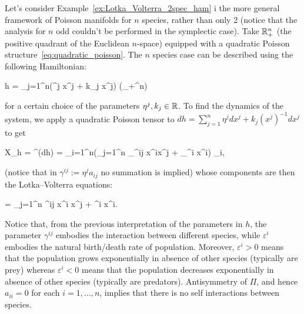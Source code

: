 \documentclass[main.tex]{subfiles}
\begin{document}
\begin{example}
\label{ex:Lotka_Volterra_nspec_pois}
	Let's consider Example~\ref{ex:Lotka_Volterra_2spec_ham} i the more general framework of Poisson manifolds for $n$ species, rather than only 2 (notice that the analysis for $n$ odd couldn't be performed in the symplectic case).
	Take $\mathbb{R}^n_+$ (the positive quadrant of the Euclidean $n$-space) equipped with a quadratic Poisson structure~\eqref{eq:quadratic_poisson}. The $n$ species case can be described using the following Hamiltonian:
	\begin{eqalign}
		h = \sum_{j=1}^n(\eta^j x^j + k_j \log x^j) \in \Cinfty(\R_+^n)
	\end{eqalign}
	for a certain choice of the parameters $\eta^j, k_j \in \mathbb{R}$. To find the dynamics of the system, we apply a quadratic Poisson tensor to $dh = \sum_{j=1}^n \eta^j dx^j + k_j (x^j)^{-1} dx^j$ to get
	\begin{eqalign}
		X_h = \Pi^\sharp(dh) = \sum_{i=1}^n\big(\sum_{j=1}^n _{\gamma^{ij}} x^ix^j + _{\varepsilon^i} x^i\big) \partial_i,
	\end{eqalign}
	(notice that in $\gamma^{ij} := \eta^j a_{ij}$ no summation is implied) whose components are then the Lotka--Volterra equations:
	\begin{eqalign}
		 = \sum_{j=1}^n \gamma^{ij} x^i x^j + \varepsilon^i x^i.
	\end{eqalign}
	Notice that, from the previous interpretation of the parameters in $h$, the parameter $\gamma^{ij}$ embodies the interaction between different species, while $\varepsilon^i$ embodies the natural birth/death rate of population. Moreover, $\varepsilon^i>0$ means that the population grows exponentially in absence of other species (typically are prey) whereas $\varepsilon^i<0$ means that the population decreases exponentially in absence of other species (typically are predators). Antisymmetry of $\Pi$, and hence $a_{ii}=0$ for each $i=1, \dots, n$, implies that there is no self interactions between species.
\end{example}
\end{document}
